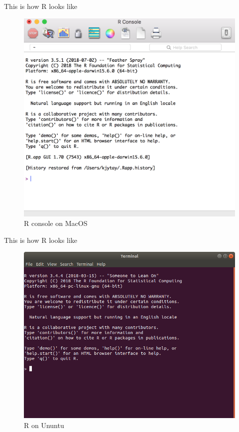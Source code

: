 \documentclass[ignorenonframetext,]{beamer}
\begin{document}
\begin{frame}{This is how R looks like}
\protect\hypertarget{this-is-how-r-looks-like-1}{}

\begin{figure}
\includegraphics[scale = .35]{figures/r-mac.png}
\caption{R console on MacOS}
\end{figure}

\end{frame}

\begin{frame}{This is how R looks like}
\protect\hypertarget{this-is-how-r-looks-like-2}{}

\begin{figure}
\includegraphics[scale = .3]{figures/r-linux}
\caption{R on Ununtu}
\end{figure}

\end{frame}
\end{document}
